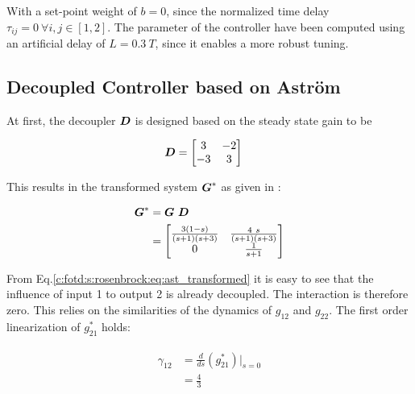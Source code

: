 With a set-point weight of $ b = 0 $, since the normalized time delay $\tau_{ij} = 0 ~\forall i,j \in [1,2]$. The parameter of the controller have been computed using an artificial delay of $L = 0.3~T$, since it enables a more robust tuning.

\subsection{Decoupled Controller based on Astr\"om}%
\label{c:fotd:s:rosebrock:sub:astrom}

At first, the decoupler $\mbox{\boldmath$D$}$ is designed based on the steady state gain to be 

\begin{align}
\begin{split}
\mbox{\boldmath$D$} &= \begin{bmatrix}
3 & -2 \\
-3 & 3
\end{bmatrix}
\end{split}
\label{c:fotd:s:rosenbrock:eq:ast_decoupler}
\end{align}

This results in the transformed system $\mbox{\boldmath$G$}^*$ as given in \cite{Astrom2001a}:

\begin{align}
\begin{split}
\mbox{\boldmath$G$}^* &= \mbox{\boldmath$G$} ~\mbox{\boldmath$D$} \\
&= \begin{bmatrix}
\frac{3\left(1-s\right)}{\left(s+1\right)\left(s+3\right)} & \frac{4~s}{\left(s+1\right)\left(s+3\right)} \\
0 &   \frac{1}{s+1}
\end{bmatrix}
\end{split}
\label{c:fotd:s:rosenbrock:eq:ast_transformed}
\end{align}

From Eq.\ref{c:fotd:s:rosenbrock:eq:ast_transformed} it is easy to see that the influence of input 1 to output 2 is already decoupled. The interaction is therefore zero. This relies on the similarities of the dynamics of $g_{12}$ and $g_{22}$. The first order linearization of $g_{21}^*$ holds:

\begin{align}
\begin{split}
\gamma_{12} &= \frac{d}{ds}\left(g_{21}^*\right) |_{s=0} \\
&= \frac{4}{3}
\end{split}
\label{c:fotd:rosenbrock:eq:ast_interaction}
\end{align}

